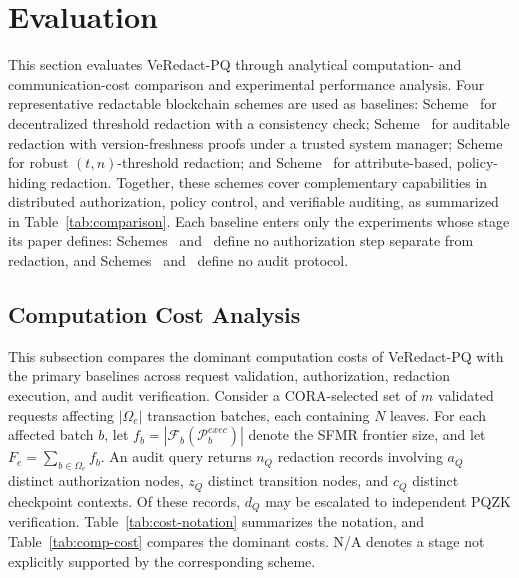 \documentclass[lettersize,journal]{IEEEtran}
\begin{document}
    \section{Evaluation}
    \label{sec:evaluation}
    
    This section evaluates VeRedact-PQ through analytical computation- and
    communication-cost comparison and experimental performance analysis.
    Four representative redactable blockchain schemes are used as
    baselines: Scheme~\cite{ref1} for decentralized threshold
    redaction with a consistency check; Scheme~\cite{ref13} for auditable redaction
    with version-freshness proofs under a trusted system manager;
    Scheme~\cite{ref27} for robust $(t,n)$-threshold redaction;
    and Scheme~\cite{ref34} for attribute-based,
    policy-hiding redaction. Together, these schemes cover complementary
    capabilities in distributed authorization, policy control, and
    verifiable auditing, as summarized in Table~\ref{tab:comparison}. Each
    baseline enters only the experiments whose stage its paper defines:
    Schemes~\cite{ref13} and~\cite{ref27} define no authorization step
    separate from redaction, and Schemes~\cite{ref27} and~\cite{ref34}
    define no audit protocol.

\subsection{Computation Cost Analysis}
\label{subsec:computation-cost}

This subsection compares the dominant computation costs of VeRedact-PQ
with the primary baselines across request validation, authorization,
redaction execution, and audit verification. Consider a CORA-selected
set of $m$ validated requests affecting $|\Omega_e|$ transaction
batches, each containing $N$ leaves. For each affected batch $b$, let
$f_b=|\mathcal{F}_b(\mathcal{P}_b^{exec})|$ denote the SFMR frontier
size, and let $F_e=\sum_{b\in\Omega_e}f_b$. An audit query returns
$n_Q$ redaction records involving $a_Q$ distinct authorization nodes,
$z_Q$ distinct transition nodes, and $c_Q$ distinct checkpoint
contexts. Of these records, $d_Q$ may be escalated to independent PQZK
verification. Table~\ref{tab:cost-notation} summarizes the notation,
and Table~\ref{tab:comp-cost} compares the dominant costs. N/A denotes
a stage not explicitly supported by the corresponding scheme.
\end{document}
